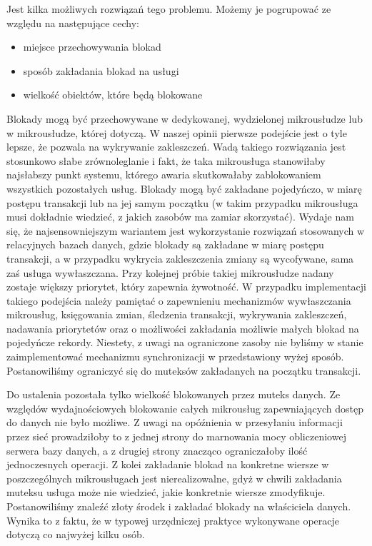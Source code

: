\documentclass[licencjacka]{pracamgr}
\begin{document}
Jest kilka możliwych rozwiązań tego problemu. Możemy je pogrupować ze względu na następujące cechy:
\begin{itemize}
	\item miejsce przechowywania blokad
	\item sposób zakładania blokad na usługi
	\item wielkość obiektów, które będą blokowane
\end{itemize}
Blokady mogą być przechowywane w dedykowanej, wydzielonej mikrousłudze lub w mikrousłudze, której dotyczą. W naszej opinii
pierwsze podejście jest o tyle lepsze, że pozwala na wykrywanie zakleszczeń. Wadą takiego rozwiązania jest
stosunkowo słabe zrównoleglanie i fakt, że taka mikrousługa stanowiłaby najsłabszy punkt systemu, którego awaria
skutkowałaby zablokowaniem wszystkich pozostałych usług. Blokady mogą być zakładane pojedyńczo, w miarę
postępu transakcji lub na jej samym początku (w takim przypadku mikrousługa musi dokładnie wiedzieć, z jakich
zasobów ma zamiar skorzystać). Wydaje nam się, że najsensowniejszym wariantem jest wykorzystanie rozwiązań
stosowanych w relacyjnych bazach danych, gdzie blokady są zakładane w miarę postępu transakcji, a w przypadku
wykrycia zakleszczenia zmiany są wycofywane, sama zaś usługa wywłaszczana. Przy kolejnej próbie takiej mikrousłudze
nadany zostaje większy priorytet, który zapewnia żywotność. W przypadku implementacji takiego podejścia należy
pamiętać o zapewnieniu mechanizmów wywłaszczania mikrousług, księgowania zmian, śledzenia transakcji, wykrywania
zakleszczeń, nadawania priorytetów oraz o możliwości zakładania możliwie małych blokad na pojedyńcze rekordy.
Niestety, z uwagi na ograniczone zasoby nie byliśmy w stanie zaimplementować mechanizmu synchronizacji w
przedstawiony wyżej sposób. Postanowiliśmy ograniczyć się do muteksów zakładanych na początku transakcji.

Do ustalenia pozostała tylko wielkość blokowanych przez muteks danych. Ze względów wydajnościowych blokowanie
całych mikrousług zapewniających dostęp do danych nie było możliwe. Z uwagi na opóźnienia w przesyłaniu informacji
przez sieć prowadziłoby to z jednej strony do marnowania mocy obliczeniowej serwera bazy danych, a z drugiej strony 
znacząco ograniczałoby ilość jednoczesnych operacji. Z kolei zakładanie blokad na konkretne wiersze w poszczególnych
mikrousługach jest nierealizowalne, gdyż w chwili zakładania muteksu usługa może nie wiedzieć, jakie konkretnie
wiersze zmodyfikuje. Postanowiliśmy znaleźć złoty środek i zakładać blokady na właściciela danych. Wynika to z
faktu, że w typowej urzędniczej praktyce wykonywane operacje dotyczą co najwyżej kilku osób.
\end{document}
